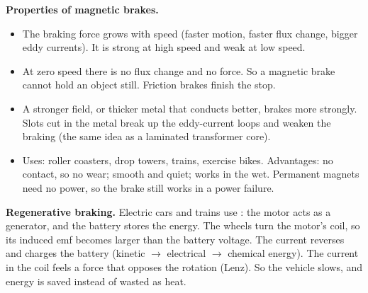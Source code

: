 \textbf{Properties of magnetic brakes.}
\begin{itemize}
  \item The braking force grows with speed (faster motion, faster flux change, bigger
        eddy currents). It is strong at high speed and weak at low speed.
  \item At zero speed there is no flux change and no force. So a magnetic brake cannot
        hold an object still. Friction brakes finish the stop.
  \item A stronger field, or thicker metal that conducts better, brakes more strongly.
        Slots cut in the metal break up the eddy-current loops and weaken the braking
        (the same idea as a laminated transformer core).
  \item Uses: roller coasters, drop towers, trains, exercise bikes. Advantages: no
        contact, so no wear; smooth and quiet; works in the wet. Permanent magnets need
        no power, so the brake still works in a power failure.
\end{itemize}

\textbf{Regenerative braking.} Electric cars and trains use :
the motor acts as a generator, and the battery stores the energy. The wheels turn the
motor's coil, so its induced emf becomes larger than the battery voltage. The current
reverses and charges the battery (kinetic $\to$ electrical $\to$ chemical energy). The
current in the coil feels a force that opposes the rotation (Lenz). So the vehicle
slows, and energy is saved instead of wasted as heat.

